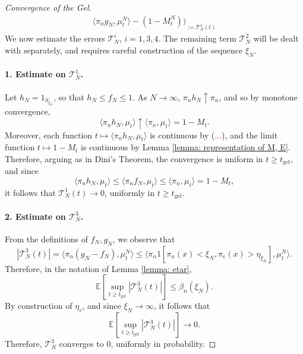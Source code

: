 \begin{proof}[Convergence of the Gel]
\begin{equation}
\begin{split}
{   \langle \pi_n g_N, \mu^N_t\rangle - (1-M^N_t))}_{:=\mathcal{T}^4_N(t)}\end{split} \end{equation} We now estimate the errors $\mathcal{T}^i_N$, $i=1,3,4.$ The remaining term $\mathcal{T}^2_N$ will be dealt with separately, and requires careful construction of the sequence $\xi_N$. \paragraph{1. Estimate on $\mathcal{T}^1_N$.} Let $h_N=1_{S_{\xi_N}}$, so that $h_N \le f_N \le 1$. As $N\rightarrow \infty$, $\pi_n h_N \uparrow \pi_n$, and so by monotone convergence, \begin{equation}
       \langle \pi_n h_N, \mu_t\rangle \uparrow \langle \pi_n, \mu_t\rangle =1-M_t.
   \end{equation} Moreover, each function $t\mapsto \langle \pi_n h_N, \mu_t\rangle$ is continuous by (\textcolor{red}{...}), and the limit function $t\mapsto 1-M_t$ is continuous by Lemma \ref{lemma: representation of M, E}. Therefore, arguing as in Dini's Theorem, the convergence is uniform in $t\geq t_\text{gel}$, and since \begin{equation}
       \langle \pi_n h_N, \mu_t\rangle \le \langle \pi_n f_N, \mu_t \rangle \le \langle \pi_n, \mu_t\rangle = 1-M_t, 
   \end{equation} it follows that $\mathcal{T}^1_N(t) \rightarrow 0$, uniformly in $t\geq t_\text{gel}$.
   \paragraph{2. Estimate on $\mathcal{T}^3_N$.} From the definitions of $f_N, g_N$, we observe that \begin{equation}
       |\mathcal{T}^3_N(t)|=\langle \pi_n(g_N-f_N), \mu^N_t\rangle \le  \langle \pi_n 1[\pi_n(x)<\xi_N, \pi_e(x)>\eta_{\xi_N}], \mu^N_t\rangle.
   \end{equation} Therefore, in the notation of Lemma \ref{lemma: etar}, \begin{equation}
       \mathbb{E}\left[\sup_{t\geq t_\text{gel}} |\mathcal{T}^3_N(t)|\right] \leq \beta_n(\xi_N).
   \end{equation} By construction of $\eta_r$, and since $\xi_N \rightarrow \infty$, it follows that \begin{equation}
       \mathbb{E}\left[\sup_{t\geq t_\text{gel}} |\mathcal{T}^3_N(t)|\right] \rightarrow 0.\end{equation} Therefore, $\mathcal{T}^3_N$ converges to $0$, uniformly in probability.

\end{proof}
